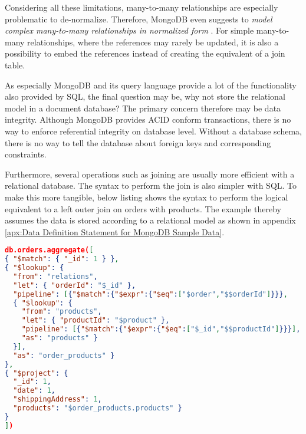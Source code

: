 Considering all these limitations, many-to-many relationships are especially problematic to de-normalize. Therefore, MongoDB even suggests to \emph{model complex many-to-many relationships in normalized form} \cite{MongoDBDataModeling}. For simple many-to-many relationships, where the references may rarely be updated, it is also a possibility to embed the references instead of creating the equivalent of a join table.\par
As especially MongoDB and its query language provide a lot of the functionality also provided by SQL, the final question may be, why not store the relational model in a document database? The primary concern therefore may be data integrity. Although MongoDB provides ACID conform transactions, there is no way to enforce referential integrity on database level. Without a database schema, there is no way to tell the database about foreign keys and corresponding constraints.\par Furthermore, several operations such as joining are usually more efficient with a relational database. The syntax to perform the join is also simpler with SQL. To make this more tangible, below listing shows the syntax to perform the logical equivalent to a left outer join on orders with products. The example thereby assumes the data is stored according to a relational model as shown in appendix \ref{apx:Data Definition Statement for MongoDB Sample Data}. 

\begin{lstlisting}[language=JSON, caption=JSON Document, captionpos=b, label=lst:JSONDocument]
db.orders.aggregate([
{ "$match": { "_id": 1 } },
{ "$lookup": {
  "from": "relations",
  "let": { "orderId": "$_id" },
  "pipeline": [{"$match":{"$expr":{"$eq":["$order","$$orderId"]}}},
  { "$lookup": {
    "from": "products",
    "let": { "productId": "$product" },
    "pipeline": [{"$match":{"$expr":{"$eq":["$_id","$$productId"]}}}],
    "as": "products" }
  }],
  "as": "order_products" }
},
{ "$project": {
  "_id": 1,
  "date": 1,
  "shippingAddress": 1,
  "products": "$order_products.products" }
}
])
\end{lstlisting}

